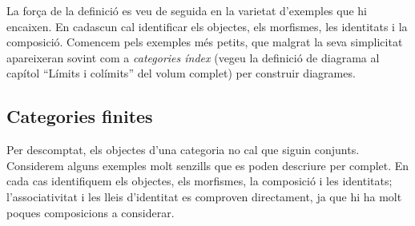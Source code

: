 La força de la definició es veu de seguida en la varietat d'exemples que hi encaixen. En cadascun cal identificar els objectes, els morfismes, les identitats i la composició. Comencem pels exemples més petits, que malgrat la seva simplicitat apareixeran sovint com a \emph{categories índex} (vegeu la definició de diagrama al capítol \enquote{Límits i colímits} del volum complet) per construir diagrames.

\subsection{Categories finites}\label{subsec:finites}

Per descomptat, els objectes d'una categoria no cal que siguin conjunts. Considerem alguns exemples molt senzills que es poden descriure per complet. En cada cas identifiquem els objectes, els morfismes, la composició i les identitats; l'associativitat i les lleis d'identitat es comproven directament, ja que hi ha molt poques composicions a considerar.
